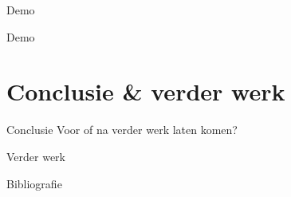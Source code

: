\documentclass[presentation, bigger]{beamer}
\begin{document}
\begin{frame}{Demo}
\begin{center}
\Huge{Demo}
\end{center}
\end{frame}

\section{Conclusie \& verder werk}
\begin{frame}{Conclusie}
Voor of na verder werk laten komen?
\end{frame}

\begin{frame}{Verder werk}
\end{frame}

\begin{frame}[allowframebreaks]{Bibliografie}

  \nocite{*}
  \printbibliography
\end{frame}
\end{document}
